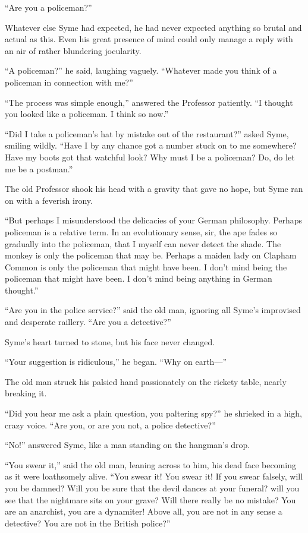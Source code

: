 \documentclass{book}
\begin{document}
“Are you a policeman?”

Whatever else Syme had expected, he had never expected anything so brutal and actual as this. Even his great presence of mind could only manage a reply with an air of rather blundering jocularity.

“A policeman?” he said, laughing vaguely. “Whatever made you think of a policeman in connection with me?”

“The process was simple enough,” answered the Professor patiently. “I thought you looked like a policeman. I think so now.”

“Did I take a policeman’s hat by mistake out of the restaurant?” asked Syme, smiling wildly. “Have I by any chance got a number stuck on to me somewhere? Have my boots got that watchful look? Why must I be a policeman? Do, do let me be a postman.”

The old Professor shook his head with a gravity that gave no hope, but Syme ran on with a feverish irony.

“But perhaps I misunderstood the delicacies of your German philosophy. Perhaps policeman is a relative term. In an evolutionary sense, sir, the ape fades so gradually into the policeman, that I myself can never detect the shade. The monkey is only the policeman that may be. Perhaps a maiden lady on Clapham Common is only the policeman that might have been. I don’t mind being the policeman that might have been. I don’t mind being anything in German thought.”

“Are you in the police service?” said the old man, ignoring all Syme’s improvised and desperate raillery. “Are you a detective?”

Syme’s heart turned to stone, but his face never changed.

“Your suggestion is ridiculous,” he began. “Why on earth—”

The old man struck his palsied hand passionately on the rickety table, nearly breaking it.

“Did you hear me ask a plain question, you paltering spy?” he shrieked in a high, crazy voice. “Are you, or are you not, a police detective?”

“No!” answered Syme, like a man standing on the hangman’s drop.

“You swear it,” said the old man, leaning across to him, his dead face becoming as it were loathsomely alive. “You swear it! You swear it! If you swear falsely, will you be damned? Will you be sure that the devil dances at your funeral? will you see that the nightmare sits on your grave? Will there really be no mistake? You are an anarchist, you are a dynamiter! Above all, you are not in any sense a detective? You are not in the British police?”
\end{document}
